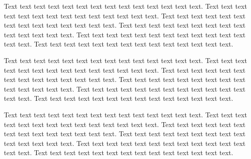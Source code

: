 \documentclass[letterpaper,11pt,oneside,pdftex]{article}
\begin{document}
Text text text text text text text text text text text text text text.
Text text text text text text text text text text text text text text.
Text text text text text text text text text text text text text text.
Text text text text text text text text text text text text text text.
Text text text text text text text text text text text text text text.
Text text text text text text text text text text text text text text.

Text text text text text text text text text text text text text text.
Text text text text text text text text text text text text text text.
Text text text text text text text text text text text text text text.
Text text text text text text text text text text text text text text.
Text text text text text text text text text text text text text text.
Text text text text text text text text text text text text text text.

Text text text text text text text text text text text text text text.
Text text text text text text text text text text text text text text.
Text text text text text text text text text text text text text text.
Text text text text text text text text text text text text text text.
Text text text text text text text text text text text text text text.
Text text text text text text text text text text text text text text.
\end{document}
